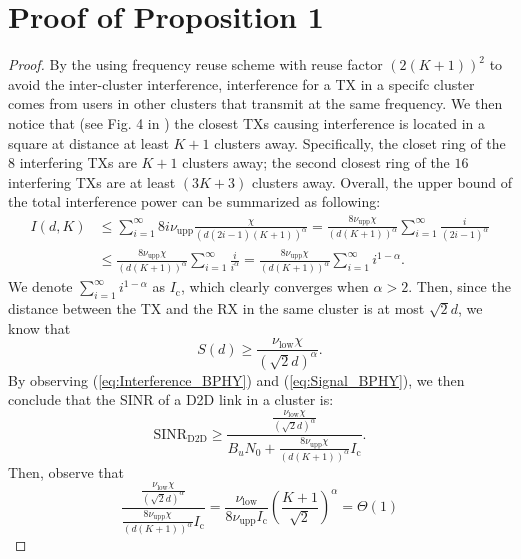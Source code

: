 \documentclass[journal,draftclsnofoot,onecolumn,12pt,twoside]{IEEEtran}
\begin{document}
\section{Proof of Proposition 1}
\label{App:ProofProp1}
\begin{proof}
By the using frequency reuse scheme with reuse factor $(2(K+1))^2$ to avoid the inter-cluster interference, interference for a TX in a specifc cluster comes from users in other clusters that transmit at the same frequency. We then notice that (see Fig. 4 in \cite{franceschetti2007closing}) the closest TXs causing interference is located in a square at distance at least $K+1$ clusters away. Specifically, the closet ring of the $8$ interfering TXs are $K+1$ clusters away; the second closest ring of the $16$ interfering TXs are at least $(3K+3)$ clusters away. Overall, the upper bound of the total interference power can be summarized as following:
\begin{equation}
\begin{aligned}\label{eq:Interference_BPHY}
I(d,K)&\leq \sum_{i=1}^{\infty} 8i\nu_{\text{upp}}\frac{\chi}{\left(d(2i-1)(K+1)\right)^{\alpha}}= \frac{8\nu_{\text{upp}}\chi}{\left(d(K+1)\right)^{\alpha}}\sum_{i=1}^{\infty}\frac{i}{(2i-1)^{\alpha}}\\
&\leq \frac{8\nu_{\text{upp}}\chi}{\left(d(K+1)\right)^{\alpha}}\sum_{i=1}^{\infty}\frac{i}{i^{\alpha}}=\frac{8\nu_{\text{upp}}\chi}{\left(d(K+1)\right)^{\alpha}}\sum_{i=1}^{\infty}i^{1-\alpha}.
\end{aligned}
\end{equation}
We denote $\sum_{i=1}^{\infty}i^{1-\alpha}$ as $I_{\text{c}}$, which clearly converges when $\alpha>2$. Then, since the distance between the TX and the RX in the same cluster is at most $\sqrt{2}d$, we know that 
\begin{equation}\label{eq:Signal_BPHY}
S(d)\geq \frac{\nu_{\text{low}}\chi}{(\sqrt{2}d)^{\alpha}}.
\end{equation}
By observing (\ref{eq:Interference_BPHY}) and (\ref{eq:Signal_BPHY}), we then conclude that the SINR of a D2D link in a cluster is:
\begin{equation}\label{eq:SINR_BPHY_1}
\text{SINR}_{\text{D2D}}\geq \frac{\frac{\nu_{\text{low}}\chi}{(\sqrt{2}d)^{\alpha}}}{B_u N_0+\frac{8\nu_{\text{upp}}\chi}{\left(d(K+1)\right)^{\alpha}}I_{\text{c}}}.
\end{equation}
Then, observe that 
\begin{equation}\label{eq:SINR_BPHY_2}
\frac{\frac{\nu_{\text{low}}\chi}{(\sqrt{2}d)^{\alpha}}}{\frac{8\nu_{\text{upp}}\chi}{\left(d(K+1)\right)^{\alpha}}I_{\text{c}}}=\frac{\nu_{\text{low}}}{8\nu_{\text{upp}}I_{\text{c}}}\left(\frac{K+1}{\sqrt{2}}\right)^{\alpha}=\Theta(1)

\end{equation}
\end{proof}
\end{document}
